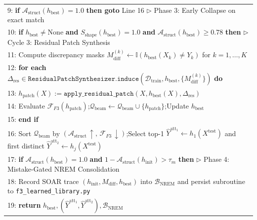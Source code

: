 \documentclass[10pt,a4paper]{article}
\begin{document}
\begin{table}[htbp]
{\begin{tabularx}{\textwidth}{X}
9: \hspace{2.4em} \textbf{if} $\mathcal{A}_{\text{struct}}(h_{\text{best}}) = 1.0$ \textbf{then goto} Line 16 \hfill $\triangleright$ Phase 3: Early Collapse on exact match \\
10: \textbf{if} $h_{\text{best}} \neq \text{None}$ \textbf{and} $S_{\text{shape}}(h_{\text{best}}) = 1.0$ \textbf{and} $\mathcal{A}_{\text{struct}}(h_{\text{best}}) \ge 0.78$ \textbf{then} \hfill $\triangleright$ Cycle 3: Residual Patch Synthesis \\
11: \hspace{1.2em} Compute discrepancy masks $M_{\text{diff}}^{(k)} \leftarrow \mathbb{I}(h_{\text{best}}(X_k) \neq Y_k)$ for $k=1,\dots,K$ \\
12: \hspace{1.2em} \textbf{for each} $\Delta_{\text{res}} \in \texttt{ResidualPatchSynthesizer.induce}(\mathcal{D}_{\text{train}}, h_{\text{best}}, \{M_{\text{diff}}^{(k)}\})$ \textbf{do} \\
13: \hspace{2.4em} $h_{\text{patch}}(X) := \texttt{apply\_residual\_patch}(X, h_{\text{best}}(X), \Delta_{\text{res}})$ \\
14: \hspace{2.4em} Evaluate $\mathcal{F}_{F3}(h_{\text{patch}})$;\quad $\mathcal{Q}_{\text{beam}} \leftarrow \mathcal{Q}_{\text{beam}} \cup \{h_{\text{patch}}\}$;\quad Update $h_{\text{best}}$ \\
15: \textbf{end if} \\
16: Sort $\mathcal{Q}_{\text{beam}}$ by $(\mathcal{A}_{\text{struct}}\,\uparrow,\, \mathcal{F}_{F3}\,\downarrow)$;\quad Select top-1 $\hat{Y}^{\text{att}_1} \leftarrow h_1(X^{\text{test}})$ and first distinct $\hat{Y}^{\text{att}_2} \leftarrow h_j(X^{\text{test}})$ \\
17: \textbf{if} $\mathcal{A}_{\text{struct}}(h_{\text{best}}) = 1.0$ \textbf{and} $1 - \mathcal{A}_{\text{struct}}(h_{\text{init}}) > \tau_m$ \textbf{then} \hfill $\triangleright$ Phase 4: Mistake-Gated NREM Consolidation \\
18: \hspace{1.2em} Record SOAR trace $(h_{\text{init}}, M_{\text{diff}}, h_{\text{best}})$ into $\mathcal{B}_{\text{NREM}}$ and persist subroutine to \texttt{f3\_learned\_library.py} \\
19: \textbf{return} $h_{\text{best}}, (\hat{Y}^{\text{att}_1}, \hat{Y}^{\text{att}_2}), \mathcal{B}_{\text{NREM}}$ \\
\bottomrule
\end{tabularx}%
}
\end{table}
\end{document}
